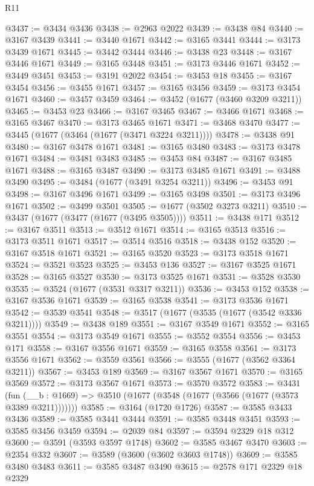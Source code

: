 \begin{lexlean}{R11}
\begin{coremodule}
@3437 := @3434 @3436
@3438 := @2963 @2022
@3439 := @3438 @84
@3440 := @3167 @3439
@3441 := @3440 @1671
@3442 := @3165 @3441
@3444 := @3173 @3439 @1671
@3445 := @3442 @3444
@3446 := @3438 @23
@3448 := @3167 @3446 @1671
@3449 := @3165 @3448
@3451 := @3173 @3446 @1671
@3452 := @3449 @3451
@3453 := @3191 @2022
@3454 := @3453 @18
@3455 := @3167 @3454
@3456 := @3455 @1671
@3457 := @3165 @3456
@3459 := @3173 @3454 @1671
@3460 := @3457 @3459
@3464 := @3452 (@1677 (@3460 @3209 @3211))
@3465 := @3453 @23
@3466 := @3167 @3465
@3467 := @3466 @1671
@3468 := @3165 @3467
@3470 := @3173 @3465 @1671
@3471 := @3468 @3470
@3477 := @3445 (@1677 (@3464 (@1677 (@3471 @3224 @3211))))
@3478 := @3438 @91
@3480 := @3167 @3478 @1671
@3481 := @3165 @3480
@3483 := @3173 @3478 @1671
@3484 := @3481 @3483
@3485 := @3453 @84
@3487 := @3167 @3485 @1671
@3488 := @3165 @3487
@3490 := @3173 @3485 @1671
@3491 := @3488 @3490
@3495 := @3484 (@1677 (@3491 @3254 @3211))
@3496 := @3453 @91
@3498 := @3167 @3496 @1671
@3499 := @3165 @3498
@3501 := @3173 @3496 @1671
@3502 := @3499 @3501
@3505 := @1677 (@3502 @3273 @3211)
@3510 := @3437 (@1677 (@3477 (@1677 (@3495 @3505))))
@3511 := @3438 @171
@3512 := @3167 @3511
@3513 := @3512 @1671
@3514 := @3165 @3513
@3516 := @3173 @3511 @1671
@3517 := @3514 @3516
@3518 := @3438 @152
@3520 := @3167 @3518 @1671
@3521 := @3165 @3520
@3523 := @3173 @3518 @1671
@3524 := @3521 @3523
@3525 := @3453 @136
@3527 := @3167 @3525 @1671
@3528 := @3165 @3527
@3530 := @3173 @3525 @1671
@3531 := @3528 @3530
@3535 := @3524 (@1677 (@3531 @3317 @3211))
@3536 := @3453 @152
@3538 := @3167 @3536 @1671
@3539 := @3165 @3538
@3541 := @3173 @3536 @1671
@3542 := @3539 @3541
@3548 := @3517 (@1677 (@3535 (@1677 (@3542 @3336 @3211))))
@3549 := @3438 @189
@3551 := @3167 @3549 @1671
@3552 := @3165 @3551
@3554 := @3173 @3549 @1671
@3555 := @3552 @3554
@3556 := @3453 @171
@3558 := @3167 @3556 @1671
@3559 := @3165 @3558
@3561 := @3173 @3556 @1671
@3562 := @3559 @3561
@3566 := @3555 (@1677 (@3562 @3364 @3211))
@3567 := @3453 @189
@3569 := @3167 @3567 @1671
@3570 := @3165 @3569
@3572 := @3173 @3567 @1671
@3573 := @3570 @3572
@3583 := @3431
    (fun (__b : @1669) => @3510 (@1677 (@3548 (@1677 (@3566 (@1677 (@3573 @3389 @3211)))))))
@3585 := @3164 (@1720 @1726)
@3587 := @3585 @3433 @3436
@3589 := @3585 @3441 @3444
@3591 := @3585 @3448 @3451
@3593 := @3585 @3456 @3459
@3594 := @2039 @84
@3597 := @3594 @2329 @18 @312
@3600 := @3591 (@3593 @3597 @1748)
@3602 := @3585 @3467 @3470
@3603 := @2354 @332
@3607 := @3589 (@3600 (@3602 @3603 @1748))
@3609 := @3585 @3480 @3483
@3611 := @3585 @3487 @3490
@3615 := @2578 @171 @2329 @18 @2329

\end{coremodule}
\end{lexlean}
